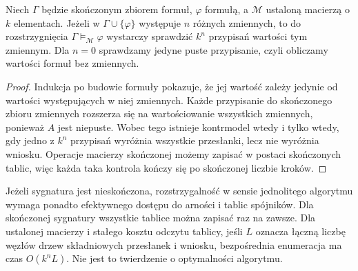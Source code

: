 \begin{stwierdzenie}
\label{prop:ncl-finite-matrix-decision}
Niech $\Gamma$ będzie skończonym zbiorem formuł,
$\varphi$ formułą, a $\mathcal M$ ustaloną macierzą
o $k$ elementach. Jeżeli w $\Gamma\cup\{\varphi\}$
występuje $n$ różnych zmiennych, to do rozstrzygnięcia
$\Gamma\models_{\mathcal M}\varphi$ wystarczy sprawdzić
$k^n$ przypisań wartości tym zmiennym.
Dla $n=0$ sprawdzamy jedyne puste przypisanie,
czyli obliczamy wartości formuł bez zmiennych.
\end{stwierdzenie}
\begin{proof}
Indukcja po budowie formuły pokazuje, że jej wartość
zależy jedynie od wartości występujących w niej zmiennych.
Każde przypisanie do skończonego zbioru zmiennych
rozszerza się na wartościowanie wszystkich zmiennych,
ponieważ $A$ jest niepuste.
Wobec tego istnieje kontrmodel wtedy i tylko wtedy,
gdy jedno z $k^n$ przypisań wyróżnia wszystkie przesłanki,
lecz nie wyróżnia wniosku. Operacje macierzy skończonej
możemy zapisać w postaci skończonych tablic, więc
każda taka kontrola kończy się po skończonej liczbie kroków.
\end{proof}
Jeżeli sygnatura jest nieskończona, rozstrzygalność
w sensie jednolitego algorytmu wymaga ponadto
efektywnego dostępu do arności i tablic spójników.
Dla skończonej sygnatury wszystkie tablice można
zapisać raz na zawsze.
Dla ustalonej macierzy i stałego kosztu odczytu tablicy,
jeśli $L$ oznacza łączną liczbę węzłów drzew składniowych
przesłanek i wniosku, bezpośrednia enumeracja ma czas
$O(k^n L)$. Nie jest to twierdzenie o optymalności algorytmu.

